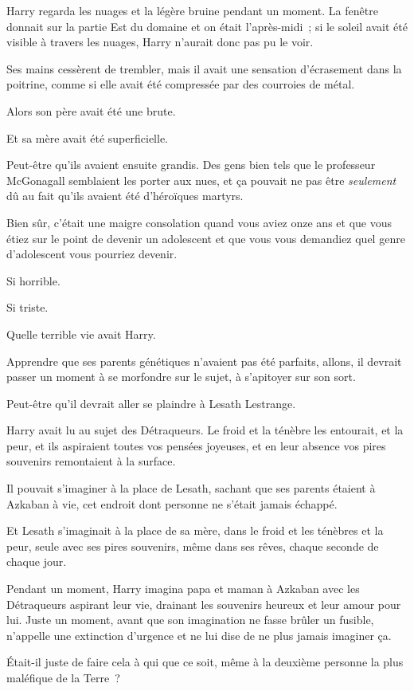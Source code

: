 Harry regarda les nuages et la légère bruine pendant un moment. La fenêtre donnait sur la partie Est du domaine et on était l'après-midi~; si le soleil avait été visible à travers les nuages, Harry n'aurait donc pas pu le voir.

Ses mains cessèrent de trembler, mais il avait une sensation d'écrasement dans la poitrine, comme si elle avait été compressée par des courroies de métal.

Alors son père avait été une brute.

Et sa mère avait été superficielle.

Peut-être qu'ils avaient ensuite grandis. Des gens bien tels que le professeur McGonagall semblaient les porter aux nues, et ça pouvait ne pas être \emph{seulement} dû au fait qu'ils avaient été d'héroïques martyrs.

Bien sûr, c'était une maigre consolation quand vous aviez onze ans et que vous étiez sur le point de devenir un adolescent et que vous vous demandiez quel genre d'adolescent vous pourriez devenir.

Si horrible.

Si triste.

Quelle terrible vie avait Harry.

Apprendre que ses parents génétiques n'avaient pas été parfaits, allons, il devrait passer un moment à se morfondre sur le sujet, à s'apitoyer sur son sort.

Peut-être qu'il devrait aller se plaindre à Lesath Lestrange.

Harry avait lu au sujet des Détraqueurs. Le froid et la ténèbre les entourait, et la peur, et ils aspiraient toutes vos pensées joyeuses, et en leur absence vos pires souvenirs remontaient à la surface.

Il pouvait s'imaginer à la place de Lesath, sachant que ses parents étaient à Azkaban à vie, cet endroit dont personne ne s'était jamais échappé.

Et Lesath s'imaginait à la place de sa mère, dans le froid et les ténèbres et la peur, seule avec ses pires souvenirs, même dans ses rêves, chaque seconde de chaque jour.

Pendant un moment, Harry imagina papa et maman à Azkaban avec les Détraqueurs aspirant leur vie, drainant les souvenirs heureux et leur amour pour lui. Juste un moment, avant que son imagination ne fasse brûler un fusible, n'appelle une extinction d'urgence et ne lui dise de ne plus jamais imaginer ça.

Était-il juste de faire cela à qui que ce soit, même à la deuxième personne la plus maléfique de la Terre~?

